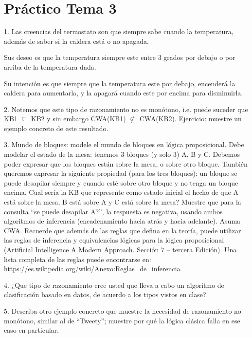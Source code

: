 \chapter{Práctico Tema 3}

1. Las creencias del termostato son que siempre sabe cuando la temperatura, además de saber si la caldera está o no apagada.

Sus deseo es que la temperatura siempre este entre 3 grados por debajo o por arriba de la temperatura dada.

Su intención es que siempre que la temperatura este por debajo, encenderá la caldera para aumentarla, y la apagará cuando este por encima para disminuirla.


2. Notemos que este tipo de razonamiento no es monótono, i.e. puede suceder que KB1 $\subseteq$ KB2 y sin embargo CWA(KB1) $\nsubseteq$ CWA(KB2). Ejercicio: muestre un ejemplo concreto de este resultado. 

3. Mundo de bloques: modele el mundo de bloques en lógica proposicional. Debe modelar el estado de la mesa: tenemos 3 bloques (y solo 3) A, B y C. Debemos poder expresar que los bloques están sobre la mesa, o sobre otro bloque. También queremos expresar la siguiente propiedad (para los tres bloques): un bloque se puede desapilar siempre y cuando esté sobre otro bloque y no tenga un bloque encima. Cual sería la KB que represente como estado inicial el hecho de que A está sobre la mesa, B está sobre A y C está sobre la mesa? Muestre que para la consulta “se puede desapilar A?”, la respuesta es negativa, usando ambos algoritmos de inferencia (encadenamiento hacia atrás y hacia adelante). Asuma CWA. Recuerde que además de las reglas que defina en la teoría, puede utilizar las reglas de inferencia y equivalencias lógicas para la lógica proposicional (Artificial Intelligence A Modern Approach. Sección 7 – tercera Edición). Una lista completa de las reglas puede encontrarse en: https://es.wikipedia.org/wiki/Anexo:Reglas_de_inferencia

4. ¿Que tipo de razonamiento cree usted que lleva a cabo un algoritmo de clasificación basado en datos, de acuerdo a los tipos vistos en clase? 

5. Describa otro ejemplo concreto que muestre la necesidad de razonamiento no monótono, similar al de “Tweety”; muestre por qué la lógica clásica falla en ese caso en particular.

\bigskip